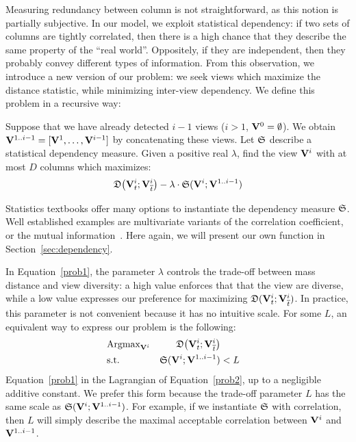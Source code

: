 Measuring redundancy between column is not straightforward, as this notion is
partially subjective. In our model, we exploit statistical dependency: if two
sets of columns are tightly correlated, then there is a high chance that they
describe the same property of the ``real world''.  Oppositely, if they are
independent, then they probably convey different types of information. From
this observation, we introduce a new version of our problem: we seek views
which maximize the distance statistic, while minimizing inter-view dependency.
We define this problem in a recursive way:
\begin{problem}
    Suppose that we have already detected $i-1$ views ($i > 1$,
    $\mathbf{V}^{0} = \emptyset$). We obtain $\mathbf{V}^{1..i-1} = [\mathbf{V}^1, \ldots,
    \mathbf{V}^{i-1}]$ by concatenating these views. Let $\mathfrak{S}$ describe a
    statistical dependency measure. Given a positive real $\lambda$, find the
    view $\mathbf{V}^{i}$ with at most $D$ columns which maximizes:
        \begin{equation}
            \label{prob1}
            \mathfrak{D}\big( \mathbf{V}^{i}_t  ; \mathbf{V}^{i}_{\overline{t}} \big) - 
            \lambda \cdot \mathfrak{S} ( \mathbf{V}^{i} ; \mathbf{V}^{1..i-1})
        \end{equation}
\end{problem}
Statistics textbooks offer many options to instantiate the dependency measure
$\mathfrak{S}$. Well established examples are multivariate variants of the
correlation coefficient, or the mutual information~\cite{wasserman2013all}.
Here again, we will present our own function in Section~\ref{sec:dependency}.

In Equation~\ref{prob1}, the parameter $\lambda$ controls the trade-off between
mass distance and view diversity: a high value enforces that that the view are
diverse, while a low value expresses our preference for maximizing $\mathfrak{D}(
\mathbf{V}^{i}_t  ; \mathbf{V}^{i}_{\overline{t}})$. In practice, this parameter is
not convenient because it has no intuitive scale. For some $L$, an
equivalent way to express our problem is the following:
\begin{equation}
    \label{prob2}
    \begin{aligned}
        & \text{Argmax}_{\mathbf{V}^{i}} 
            & \mathfrak{D}\big( \mathbf{V}^{i}_t  ; \mathbf{V}^{i}_{\overline{t}} \big)\\
        & \text{s.t.} 
        &\mathfrak{S} ( \mathbf{V}^{i} ; \mathbf{V}^{1..i-1}) & < L\\ 
    \end{aligned}
\end{equation}
Equation~\ref{prob1} in the Lagrangian of Equation~\ref{prob2}, up to a
negligible additive constant. We prefer this form because the trade-off
parameter $L$ has the same scale as $\mathfrak{S} ( \mathbf{V}^{i} ; \mathbf{V}^{1..i-1}) $.
For example, if we instantiate $\mathfrak{S}$ with correlation, then $L$ will simply
describe the maximal acceptable correlation between $\mathbf{V}^{i}$ and
$\mathbf{V}^{1..i-1}$.

